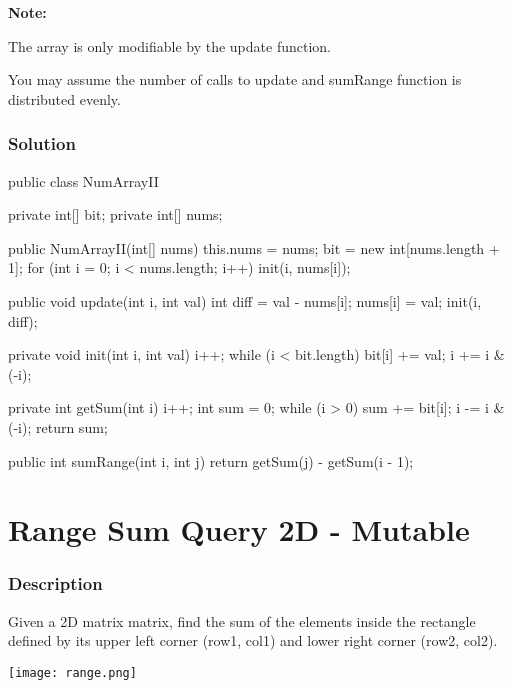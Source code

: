 \textbf{Note:}

The array is only modifiable by the update function.

You may assume the number of calls to update and sumRange function is distributed evenly.

\subsubsection{Solution}

\begin{Code}
public class NumArrayII {
    private int[] bit;
    private int[] nums;

    public NumArrayII(int[] nums) {
        this.nums = nums;
        bit = new int[nums.length + 1];
        for (int i = 0; i < nums.length; i++) {
            init(i, nums[i]);
        }
    }

    public void update(int i, int val) {
        int diff = val - nums[i];
        nums[i] = val;
        init(i, diff);
    }

    private void init(int i, int val) {
        i++;
        while (i < bit.length) {
            bit[i] += val;
            i += i & (-i);
        }
    }

    private int getSum(int i) {
        i++;
        int sum = 0;
        while (i > 0) {
            sum += bit[i];
            i -= i & (-i);
        }
        return sum;
    }

    public int sumRange(int i, int j) {
        return getSum(j) - getSum(i - 1);
    }
}
\end{Code}

\newpage

\section{Range Sum Query 2D - Mutable} %

\subsubsection{Description}
Given a 2D matrix matrix, find the sum of the elements inside the rectangle defined by its upper left corner (row1, col1) and lower right corner (row2, col2).

\begin{center}
\texttt{[image: range.png]}\\
\end{center}

